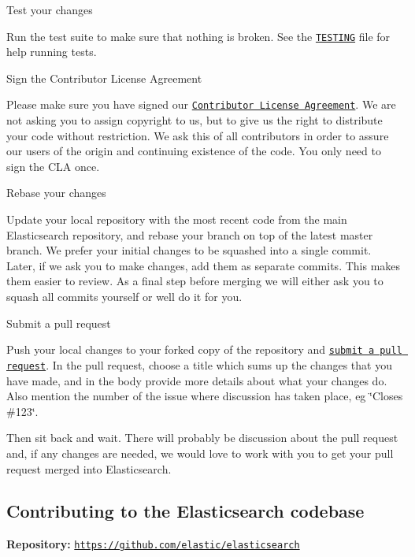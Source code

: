 \begin{DoxyEnumerate}
\item Test your changes

Run the test suite to make sure that nothing is broken. See the \href{TESTING.asciidoc}{\tt T\+E\+S\+T\+I\+NG} file for help running tests.
\item Sign the Contributor License Agreement

Please make sure you have signed our \href{https://www.elastic.co/contributor-agreement/}{\tt Contributor License Agreement}. We are not asking you to assign copyright to us, but to give us the right to distribute your code without restriction. We ask this of all contributors in order to assure our users of the origin and continuing existence of the code. You only need to sign the C\+LA once.
\item Rebase your changes

Update your local repository with the most recent code from the main Elasticsearch repository, and rebase your branch on top of the latest master branch. We prefer your initial changes to be squashed into a single commit. Later, if we ask you to make changes, add them as separate commits. This makes them easier to review. As a final step before merging we will either ask you to squash all commits yourself or we\textquotesingle{}ll do it for you.
\item Submit a pull request

Push your local changes to your forked copy of the repository and \href{https://help.github.com/articles/using-pull-requests}{\tt submit a pull request}. In the pull request, choose a title which sums up the changes that you have made, and in the body provide more details about what your changes do. Also mention the number of the issue where discussion has taken place, eg \char`\"{}\+Closes \#123\char`\"{}.
\end{DoxyEnumerate}

Then sit back and wait. There will probably be discussion about the pull request and, if any changes are needed, we would love to work with you to get your pull request merged into Elasticsearch.

\subsection*{Contributing to the Elasticsearch codebase }

{\bfseries Repository\+:} \href{https://github.com/elastic/elasticsearch}{\tt https\+://github.\+com/elastic/elasticsearch}


